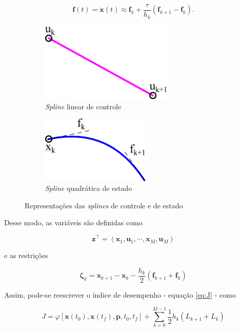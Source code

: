 \begin{equation}
    \mathbf{f}(t) = \dot{\mathbf{x}}(t) \approx \mathbf{f}_k + \dfrac{\tau}{h_k} (\mathbf{f}_{k+1} - \mathbf{f}_k).
\end{equation}

\begin{figure}[H]
    \centering
    \begin{subfigure}{0.48\linewidth}
        \centering
        \includegraphics[width=0.7\textwidth]{Cap2/linear-spline.pdf}
        \caption{\textit{Spline} linear de controle}
    \end{subfigure}
    \hfill
    \begin{subfigure}{0.48\linewidth}
        \centering
        \includegraphics[width=0.57\textwidth]{Cap2/quadratic-spline.pdf}
        \caption{\textit{Spline} quadrática de estado}
    \end{subfigure}
    \caption{Representações das \textit{splines} de controle e de estado}
    \label{fig:splines}
\end{figure}

Desse modo, as variáveis são definidas como

\begin{equation}
    \mathbf{z}^\intercal = \left( \mathbf{x}_1, \mathbf{u}_1, \cdots, \mathbf{x}_M, \mathbf{u}_M \right)
\end{equation}

\noindent e as restrições

\begin{equation}
    \boldsymbol{\zeta}_k = \mathbf{x}_{k+1} - \mathbf{x}_k - \dfrac{h_k}{2} \left( \mathbf{f}_{k+1} + \mathbf{f}_k \right)
\end{equation}

Assim, pode-se reescrever o índice de desempenho - equação \ref{eq:J} - como

\begin{equation}
    J = \varphi \left[ \mathbf{x} \left( t_0 \right), \mathbf{x} \left( t_f \right), \mathbf{p}, t_0, t_f \right]
    + \sum_{k=0}^{M-1} \dfrac{1}{2} h_k \left( L_{k+1} + L_k \right)
\end{equation}


